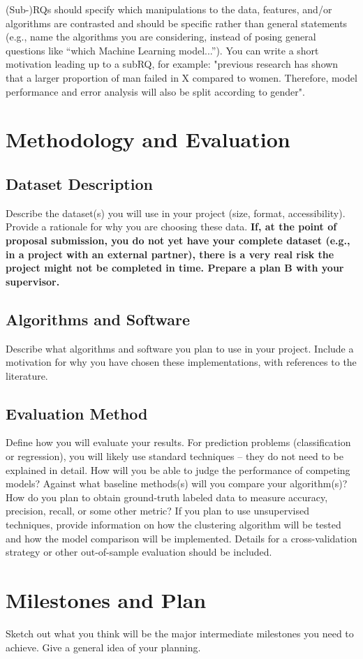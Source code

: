 \documentclass[11pt, a4paper]{article}
\begin{document}
(Sub-)RQs should specify which manipulations to the data, features, and/or algorithms are contrasted and should be specific rather than general statements (e.g., name the algorithms you are considering, instead of posing general questions like ``which Machine Learning model...''). You can write a short motivation leading up to a subRQ, for example: "previous research has shown that a larger proportion of man failed in X compared to women. Therefore, model performance and error analysis will also be split according to gender".

\section{Methodology and Evaluation}
\subsection{Dataset Description}
Describe the dataset(s) you will use in your project (size, format, accessibility). Provide a rationale for why you are choosing these data. \textbf{If, at the point of proposal submission, you do not yet have your complete dataset (e.g., in a project with an external partner), there is a very real risk the project might not be completed in time. Prepare a plan B with your supervisor.} 

\subsection{Algorithms and Software}
Describe what algorithms and software you plan to use in your project. Include a motivation for why you have chosen these implementations, with references to the literature.

\subsection{Evaluation Method}
Define how you will evaluate your results. For prediction problems (classification or regression), you will likely use standard techniques – they do not need to be explained in detail. How will you be able to judge the performance of competing models? Against what baseline methods(s) will you compare your algorithm(s)? How do you plan to obtain ground-truth labeled data to measure accuracy, precision, recall, or some other metric? If you plan to use unsupervised techniques, provide information on how the clustering algorithm will be tested and how the model comparison will be implemented. Details for a cross-validation strategy or other out-of-sample evaluation should be included.
\section{Milestones and Plan}

Sketch out what you think will be the major intermediate milestones you need to achieve. Give a general idea of your planning.

\printbibliography
\end{document}

